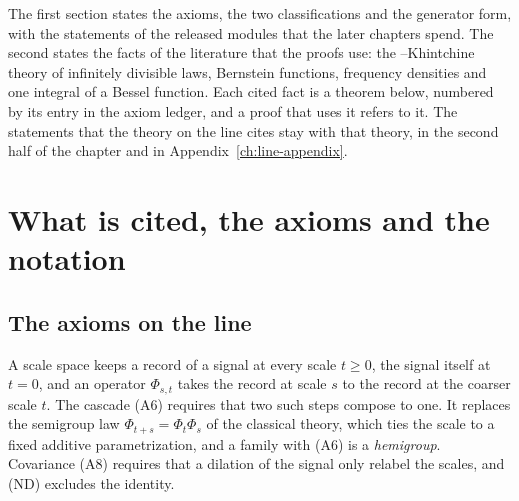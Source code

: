 The first section states the axioms, the two classifications and the generator form, with the
statements of the released modules that the later chapters spend. The second states the facts of
the literature that the proofs use: the \Levy--Khintchine theory of infinitely divisible laws,
Bernstein functions, \Polya{} frequency densities and one integral of a Bessel function. Each cited
fact is a theorem below, numbered by its entry in the axiom ledger, and a proof that uses it refers
to it. The statements that the theory on the line cites stay with that theory, in the second half
of the chapter and in Appendix~\ref{ch:line-appendix}.

\section{What is cited, the axioms and the notation}
\label{sec:cited}

\subsection{The axioms on the line}
\label{subsec:cited-line}

A scale space keeps a record of a signal at every scale $t \ge 0$, the signal itself at $t = 0$,
and an operator $\Phi_{s,t}$ takes the record at scale $s$ to the record at the coarser scale $t$.
The cascade (A6) requires that two such steps compose to one. It replaces the semigroup law
$\Phi_{t+s} = \Phi_t\Phi_s$ of the classical theory, which ties the scale to a fixed additive
parametrization, and a family with (A6) is a \emph{hemigroup}. Covariance (A8) requires that a dilation
of the signal only relabel the scales, and (ND) excludes the identity.

